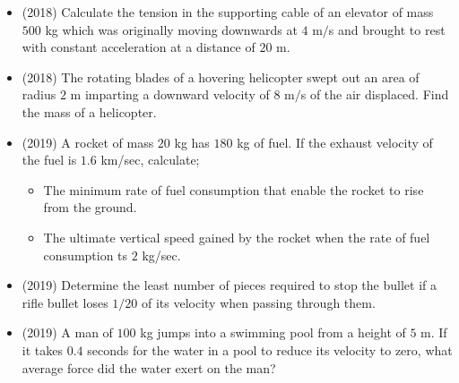 \documentclass{article}
\begin{document}
\begin{itemize}
\item (2018)  Calculate the tension in the supporting cable of an elevator of mass $ 500$ kg which was originally moving downwards at $ 4$ m$/$s and brought to rest with constant acceleration at a distance of $ 20$ m. 
\item (2018)  The rotating blades of a hovering helicopter swept out an area of radius $ 2$ m imparting a downward velocity of $ 8$ m$/$s of the air displaced. Find the mass of a helicopter. 
\item (2019)  A rocket of mass $ 20$ kg has $ 180$ kg of fuel. If the exhaust velocity of the fuel is $ 1.6$ km/sec, calculate;\begin{itemize}
\item The minimum rate of fuel consumption that enable the rocket to rise from the ground. 
\item The ultimate vertical speed gained by the rocket when the rate of fuel consumption ts $ 2$ kg/sec. 
\end{itemize}
\item (2019)  Determine the least number of pieces required to stop the bullet if a rifle bullet loses $ 1/20$ of its velocity when passing through them.
\item (2019)  A man of $ 100$ kg jumps into a swimming pool from a height of $ 5$ m. If it takes $ 0.4$ seconds for the water in a pool to reduce its velocity to zero, what average force did  the water exert on the man? 
\end{itemize}
\end{document}
